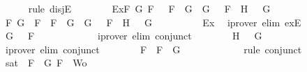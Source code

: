 \begin{isabellebody}
\ \ \ \ \isamarkupfalse%
\ {\isacharparenleft}rule\ disjE{\isacharparenright}\isanewline
\ \ \ \ \ \ \isamarkupfalse%
\ Ex{}{\isacharcolon}{\isachardoublequoteopen}{\isasymexists}F{}\ G{}{\isachardot}\ F\ {\isacharequal}\ \isactrlbold {\isasymnot}\ {\isacharparenleft}F{}\ \isactrlbold {\isasymor}\ G{}{\isacharparenright}\ {\isasymand}\ G\ {\isacharequal}\ \isactrlbold {\isasymnot}\ F{}\ {\isasymand}\ H\ {\isacharequal}\ \isactrlbold {\isasymnot}\ G{}{\isachardoublequoteclose}\ \isanewline
\ \ \ \ \ \ \isamarkupfalse%
\ F{}\ G{}\ \ {}{\isacharcolon}{\isachardoublequoteopen}F\ {\isacharequal}\ \isactrlbold {\isasymnot}{\isacharparenleft}F{}\ \isactrlbold {\isasymor}\ G{}{\isacharparenright}\ {\isasymand}\ G\ {\isacharequal}\ \isactrlbold {\isasymnot}\ F{}\ {\isasymand}\ H\ {\isacharequal}\ \isactrlbold {\isasymnot}\ G{}{\isachardoublequoteclose}\isanewline
\ \ \ \ \ \ \ \ \isamarkupfalse%
\ Ex{}\ \isamarkupfalse%
\ {\isacharparenleft}iprover\ elim{\isacharcolon}\ exE{\isacharparenright}\isanewline
\ \ \ \ \ \ \isamarkupfalse%
\ {\isachardoublequoteopen}G\ {\isacharequal}\ \isactrlbold {\isasymnot}\ F{}{\isachardoublequoteclose}\isanewline
\ \ \ \ \ \ \ \ \isamarkupfalse%
\ {}\ \isamarkupfalse%
\ {\isacharparenleft}iprover\ elim{\isacharcolon}\ conjunct{}{\isacharparenright}\isanewline
\ \ \ \ \ \ \isamarkupfalse%
\ {\isachardoublequoteopen}H\ {\isacharequal}\ \isactrlbold {\isasymnot}\ G{}{\isachardoublequoteclose}\isanewline
\ \ \ \ \ \ \ \ \isamarkupfalse%
\ {}\ \isamarkupfalse%
\ {\isacharparenleft}iprover\ elim{\isacharcolon}\ conjunct{}{\isacharparenright}\isanewline
\ \ \ \ \ \ \isamarkupfalse%
\ {\isachardoublequoteopen}F\ {\isacharequal}\ \isactrlbold {\isasymnot}{\isacharparenleft}F{}\ \isactrlbold {\isasymor}\ G{}{\isacharparenright}{\isachardoublequoteclose}\isanewline
\ \ \ \ \ \ \ \ \isamarkupfalse%
\ {}\ \isamarkupfalse%
\ {\isacharparenleft}rule\ conjunct{}{\isacharparenright}\isanewline
\ \ \ \ \ \ \isamarkupfalse%
\ {\isachardoublequoteopen}sat\ {\isacharparenleft}{\isacharbraceleft}\isactrlbold {\isasymnot}\ F{}{\isacharcomma}\ \isactrlbold {\isasymnot}\ G{}{\isacharcomma}\ F{\isacharbraceright}\ {\isasymunion}\ Wo{\isacharparenright}{\isachardoublequoteclose}\isanewline

\end{isabellebody}
